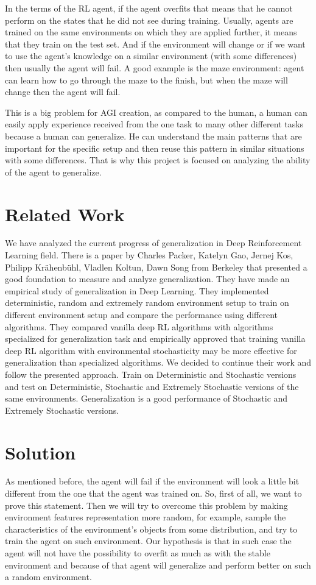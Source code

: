 In the terms of the RL agent, if the agent overfits that means that he cannot perform on the states that he did not see during training. Usually, agents are trained on the same environments on which they are applied further, it means that they train on the test set. And if the environment will change or if we want to use the agent's knowledge on a similar environment (with some differences) then usually the agent will fail. A good example is the maze environment: agent can learn how to go through the maze to the finish, but when the maze will change then the agent will fail. 

This is a big problem for AGI creation, as compared to the human, a human can easily apply experience received from the one task to many other different tasks because a human can generalize. He can understand the main patterns that are important for the specific setup and then reuse this pattern in similar situations with some differences. That is why this project is focused on analyzing the ability of the agent to generalize.


\section{Related Work}

We have analyzed the current progress of generalization in Deep Reinforcement Learning field. There is a paper \cite{GeneralizationPaper} by Charles Packer, Katelyn Gao, Jernej Kos, Philipp Krähenbühl, Vladlen Koltun, Dawn Song from Berkeley that presented a good foundation to measure and analyze generalization. They have made an empirical study of generalization in Deep Learning. They implemented deterministic, random and extremely random environment setup to train on different environment setup and compare the performance using different algorithms. They compared vanilla deep RL algorithms with algorithms specialized for generalization task and empirically approved that training vanilla deep RL algorithm with environmental stochasticity may be more effective for generalization than specialized algorithms. We decided to continue their work and follow the presented approach. Train on Deterministic and Stochastic versions and test on Deterministic, Stochastic and Extremely Stochastic versions of the same environments. Generalization is a good performance of Stochastic and Extremely Stochastic versions.

\section{Solution}
As mentioned before, the agent will fail if the environment will look a little bit different from the one that the agent was trained on. So, first of all, we want to prove this statement. Then we will try to overcome this problem by making environment features representation more random, for example, sample the characteristics of the environment's objects from some distribution, and try to train the agent on such environment. Our hypothesis is that in such case the agent will not have the possibility to overfit as much as with the stable environment and because of that agent will generalize and perform better on such a random environment.

